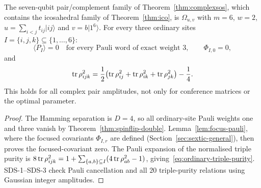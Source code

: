 \begin{corollary}\label{cor:ordinary-triples}
The seven-qubit pair/complement family of
Theorem~\ref{thm:complexsos}, which contains the
icosahedral family of Theorem~\ref{thm:ico}, is $\Omega_{u,v}$ with
$m=6$, $w=2$, $u=\sum_{i<j}t_{ij}|ij\rangle$ and
$v=b|1^6\rangle$. For every three ordinary sites
$I=\{i,j,k\}\subseteq\{1,\ldots,6\}$:
\[
 \langle P_I\rangle=0
 \quad\text{for every Pauli word of exact weight }3,
 \qquad \Phi_{I,0}=0,
\]
and
\begin{equation}\label{eq:ordinary-triple-purity}
 \operatorname{tr}\rho_{ijk}^2=
 \frac12\bigl(\operatorname{tr}\rho_{ij}^2+\operatorname{tr}\rho_{ik}^2+
                 \operatorname{tr}\rho_{jk}^2\bigr)-\frac14.
\end{equation}
This holds for all complex pair amplitudes, not only for
conference matrices or the optimal parameter.
\end{corollary}
\begin{proof}
The Hamming separation is $D=4$, so all ordinary-site
Pauli weights one and three vanish by
Theorem~\ref{thm:spinflip-double}. Lemma~\ref{lem:focus-pauli}, where the focused covariants $\Phi_{I,r}$ are
defined (Section~\ref{sec:sextic-general}), then proves the focused-covariant zero.
The Pauli expansion of the normalised triple purity is
$8\operatorname{tr}\rho_{ijk}^2=1+\sum_{\{a,b\}\subseteq I}
(4\operatorname{tr}\rho_{ab}^2-1)$, giving~\eqref{eq:ordinary-triple-purity}.
SDS-1--SDS-3 check Pauli cancellation and
all $20$ triple-purity relations using Gaussian integer amplitudes.
\end{proof}


